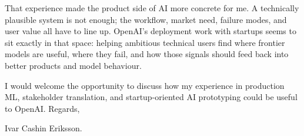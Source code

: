 \documentclass[11pt,a4paper]{moderncv}
\begin{document}
\hspace*{2em}
That experience made the product side of AI more concrete for me. A technically plausible system is not enough; the workflow, market need, failure modes, and user value all have to line up. OpenAI's deployment work with startups seems to sit exactly in that space: helping ambitious technical users find where frontier models are useful, where they fail, and how those signals should feed back into better products and model behaviour.

\vspace*{2em}
I would welcome the opportunity to discuss how my experience in production ML, stakeholder translation, and startup-oriented AI prototyping could be useful to OpenAI. Regards,

\vspace*{1em}
Ivar Cashin Eriksson.
\end{document}
